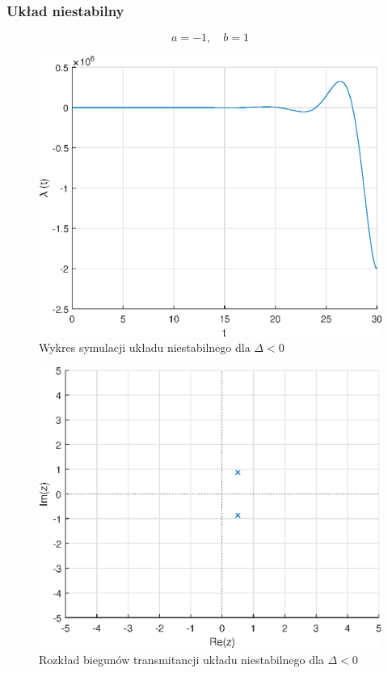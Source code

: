 \documentclass[a4paper]{article}
\begin{document}
\subsubsection{Układ niestabilny}
$$
a=-1,\quad b=1
$$
\begin{figure}[H]
    \centering
    \includegraphics[scale=0.6]{c2.eps}
    \caption{Wykres symulacji układu niestabilnego dla $\Delta<0$}
\end{figure}
\begin{figure}[H]
    \centering
    \includegraphics[scale=0.6]{c2_z.eps}
    \caption{Rozkład biegunów transmitancji układu niestabilnego dla $\Delta<0$}
\end{figure}
\end{document}
